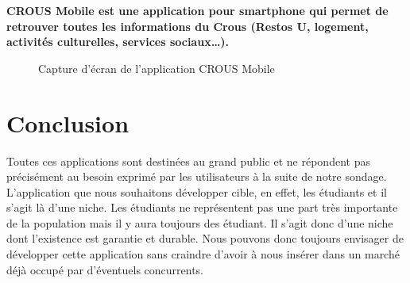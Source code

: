 \bf{CROUS Mobile} est une application pour smartphone qui permet de retrouver toutes les informations du Crous (Restos U, logement, activités culturelles, services sociaux…).

\begin{figure}[H]
    \label{fig-crous-mobile}
    \noindent{}
    \caption{Capture d'écran de l'application CROUS Mobile}
\end{figure}

\section{Conclusion}

Toutes ces applications sont destinées au grand public et ne répondent pas précisément au besoin 
exprimé par les utilisateurs à la suite de notre sondage. L'application que nous souhaitons développer cible, en effet, les étudiants et il s'agit là d'une niche. Les étudiants ne représentent pas une part très importante de la population mais il y aura toujours des étudiant. Il s'agit donc d'une niche dont l'existence est garantie et durable. Nous pouvons donc toujours envisager de développer cette application sans craindre d'avoir à nous insérer dans un marché déjà occupé par d'éventuels concurrents.
